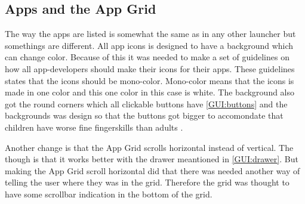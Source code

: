 \subsection{Apps and the App Grid}
\label{GUI:app}

The way the apps are listed is somewhat the same as in any other launcher but somethings are different. All app icons is designed to have a background which can change color. Because of this it was needed to make a set of guidelines on how all app-developers should make their icons for their apps. These guidelines states that the icons should be mono-color. Mono-color means that the icons is made in one color and this one color in this case is white.
The background also got the round corners which all clickable buttons have \autoref{GUI:buttons} and the backgrounds was design so that the buttons got bigger to accomondate that children have worse fine fingerskills than adults .

Another change is that the App Grid scrolls horizontal instead of vertical. The though is that it works better with the drawer meantioned in \autoref{GUI:drawer}. But making the App Grid scroll horizontal did that there was needed another way of telling the user where they was in the grid. Therefore the grid was thought to have some scrollbar indication in the bottom of the grid.